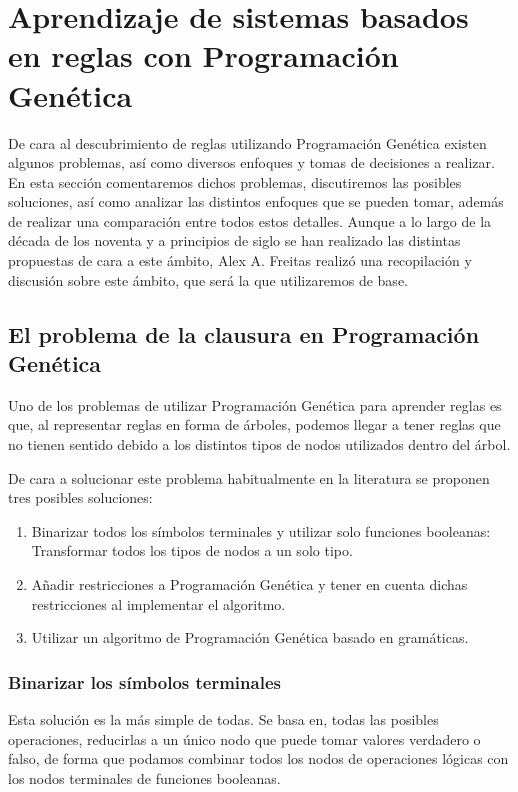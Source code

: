 \section{Aprendizaje de sistemas basados en reglas con Programación Genética}

De cara al descubrimiento de reglas utilizando Programación Genética existen algunos problemas, así como diversos enfoques y tomas de decisiones a realizar. En esta sección comentaremos dichos problemas, discutiremos las posibles soluciones, así como analizar las distintos enfoques que se pueden tomar, además de realizar una comparación entre todos estos detalles. Aunque a lo largo de la década de los noventa y a principios de siglo se han realizado las distintas propuestas de cara a este ámbito, Alex A. Freitas \cite{dataMiningDescubrimientoReglasGeneticos} realizó una recopilación y discusión sobre este ámbito, que será la que utilizaremos de base.


\subsection{El problema de la clausura en Programación Genética}

Uno de los problemas de utilizar Programación Genética para aprender reglas es que, al representar reglas en forma de árboles, podemos llegar a tener reglas que no tienen sentido debido a los distintos tipos de nodos utilizados dentro del árbol.

De cara a solucionar este problema habitualmente en la literatura se proponen tres posibles soluciones:

\begin{enumerate}
	\item Binarizar todos los símbolos terminales y utilizar solo funciones booleanas: Transformar todos los tipos de nodos a un solo tipo.
	\item Añadir restricciones a Programación Genética y tener en cuenta dichas restricciones al implementar el algoritmo.
	\item Utilizar un algoritmo de Programación Genética basado en gramáticas.
\end{enumerate}

\subsubsection{Binarizar los símbolos terminales}

Esta solución es la más simple de todas. Se basa en, todas las posibles operaciones, reducirlas a un único nodo que puede tomar valores verdadero o falso, de forma que podamos combinar todos los nodos de operaciones lógicas con los nodos terminales de funciones booleanas.

